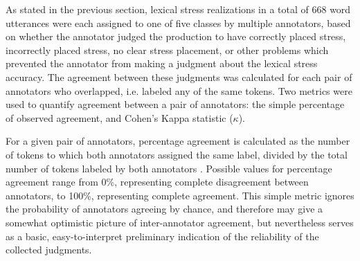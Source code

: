 	As stated in the previous section,
	lexical stress realizations in a total of 
	668 word utterances were each assigned to one of five classes by multiple annotators, based on whether the annotator judged the production to have correctly placed stress, incorrectly placed stress, no clear stress placement, or other problems which prevented the annotator from making a judgment about the lexical stress accuracy. The agreement between these judgments was calculated for each pair of annotators who overlapped, i.e. labeled any of the same tokens. 
		Two metrics were used to quantify agreement between a pair of annotators: the simple percentage of observed agreement, and Cohen's Kappa statistic ($\kappa$). 
		
		For a given pair of annotators, percentage agreement is calculated as the number of tokens to which both annotators assigned the same label, divided by the total number of tokens labeled by both annotators . Possible values for percentage agreement range from 0\%, representing complete disagreement between annotators, to 100\%, representing complete agreement. This simple metric ignores the probability of annotators agreeing by chance, and therefore may give a somewhat optimistic picture of inter-annotator agreement, but nevertheless serves as a basic, easy-to-interpret preliminary indication of the reliability of the collected judgments.
		
